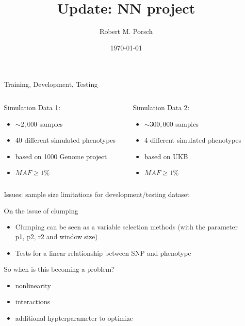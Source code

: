 \documentclass{beamer}
\title{Update: NN project}
\date{\today}
\author{Robert M. Porsch}
\institute{Center for Genomic Science}
\begin{document}
\maketitle

\begin{frame}[t]{Training, Development, Testing}
  \begin{columns}[t]
    \begin{column}{0.5\textwidth}
      Simulation Data 1:\\
      \begin{itemize}
        \item $\sim2,000$ samples
        \item 40 different simulated phenotypes
        \item based on 1000 Genome project
        \item $MAF\geq1\%$
      \end{itemize}
    \end{column}
    \begin{column}{0.5\textwidth}
     Simulation Data 2: 
     \begin{itemize}
       \item $\sim300,000$ samples
       \item 4 different simulated phenotypes
       \item based on UKB
        \item $MAF\geq1\%$
     \end{itemize}
    \end{column}
  \end{columns}
  Issues: sample size limitations for development/testing dataset 
\end{frame}

\begin{frame}[t]{On the issue of clumping}
  \begin{itemize}
    \item Clumping can be seen as a variable selection methods (with the parameter p1, p2, r2 and window size)
    \item Tests for a linear relationship between SNP and phenotype
  \end{itemize}
  So when is this becoming a problem?
  \begin{itemize}
    \item nonlinearity
    \item interactions
    \item additional hypterparameter to optimize
  \end{itemize}
\end{frame}
\end{document}
